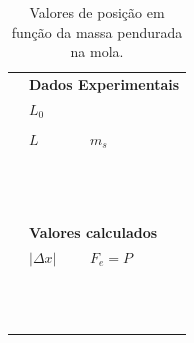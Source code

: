 \begin{table}
\centering
\begin{tabular}{lp{25mm}p{25mm}l}
\toprule
	& \multicolumn{3}{l}{\textbf{Dados Experimentais}} \\
	\cmidrule{2-3}
	& \cellcolor[gray]{0.89} $L_0$ & \cellcolor[gray]{0.92} \\
	\cmidrule{2-3}
	\\
	\cmidrule{2-3}
	& $L$ & $m_s$ & \\
	\cmidrule{2-3}
	& \cellcolor[gray]{0.89} & \cellcolor[gray]{0.92} \\
	& \cellcolor[gray]{0.95} & \cellcolor[gray]{0.97} \\
	& \cellcolor[gray]{0.89} & \cellcolor[gray]{0.92} \\
	& \cellcolor[gray]{0.95} & \cellcolor[gray]{0.97} \\
	& \cellcolor[gray]{0.89} & \cellcolor[gray]{0.92} \\
	& \cellcolor[gray]{0.95} & \cellcolor[gray]{0.97} \\
	& \cellcolor[gray]{0.89} & \cellcolor[gray]{0.92} \\
	& \cellcolor[gray]{0.95} & \cellcolor[gray]{0.97} \\
	& \cellcolor[gray]{0.89} & \cellcolor[gray]{0.92} \\
	& \cellcolor[gray]{0.95} & \cellcolor[gray]{0.97} \\
	& \cellcolor[gray]{0.89} & \cellcolor[gray]{0.92} \\
	& \cellcolor[gray]{0.95} & \cellcolor[gray]{0.97} \\
	\cmidrule{2-3}
\\
	& \multicolumn{3}{l}{\textbf{Valores calculados}} \\
	\cmidrule{2-3}
	& $|\Delta x|$ & $F_e = P$ \\
	\cmidrule{2-4}
	& \cellcolor[gray]{0.89} & \cellcolor[gray]{0.92} \\
	& \cellcolor[gray]{0.95} & \cellcolor[gray]{0.97} \\
	& \cellcolor[gray]{0.89} & \cellcolor[gray]{0.92} \\
	& \cellcolor[gray]{0.95} & \cellcolor[gray]{0.97} \\
	& \cellcolor[gray]{0.89} & \cellcolor[gray]{0.92} \\
	& \cellcolor[gray]{0.95} & \cellcolor[gray]{0.97} \\
	& \cellcolor[gray]{0.89} & \cellcolor[gray]{0.92} \\
	& \cellcolor[gray]{0.95} & \cellcolor[gray]{0.97} \\
	& \cellcolor[gray]{0.89} & \cellcolor[gray]{0.92} \\
	& \cellcolor[gray]{0.95} & \cellcolor[gray]{0.97} \\
	& \cellcolor[gray]{0.89} & \cellcolor[gray]{0.92} \\
	& \cellcolor[gray]{0.95} & \cellcolor[gray]{0.97} \\
	\cmidrule{2-3}
\bottomrule
\end{tabular}
\caption{Valores de posição em função da massa pendurada na mola.}
\label{Dados}
\end{table}
